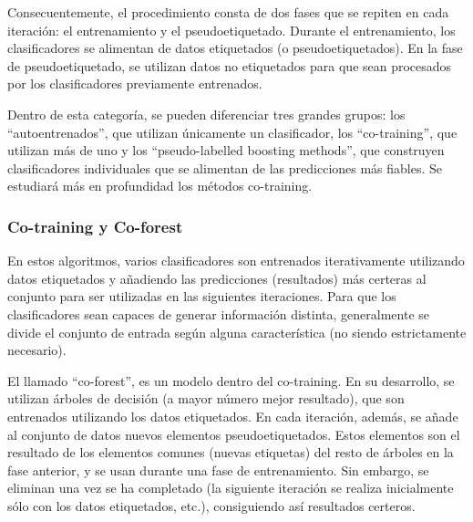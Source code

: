 Consecuentemente, el procedimiento consta de dos fases que se repiten en cada iteración: el entrenamiento y el pseudoetiquetado. Durante el entrenamiento, los clasificadores se alimentan de datos etiquetados (o pseudoetiquetados). En la fase de pseudoetiquetado, se utilizan datos no etiquetados para que sean procesados por los clasificadores previamente entrenados. 

Dentro de esta categoría, se pueden diferenciar tres grandes grupos: los “autoentrenados”, que utilizan únicamente un clasificador, los “co-training”, que utilizan más de uno y los “pseudo-labelled boosting methods”, que construyen clasificadores individuales que se alimentan de las predicciones más fiables. Se estudiará más en profundidad los métodos co-training.

\subsubsection{Co-training y Co-forest}

En estos algoritmos, varios clasificadores son entrenados iterativamente utilizando datos etiquetados y añadiendo las predicciones (resultados) más certeras al conjunto para ser utilizadas en las siguientes iteraciones. Para que los clasificadores sean capaces de generar información distinta, generalmente se divide el conjunto de entrada según alguna característica (no siendo estrictamente necesario).

El llamado “co-forest”, es un modelo dentro del co-training. En su desarrollo, se utilizan árboles de decisión (a mayor número mejor resultado), que son entrenados utilizando los datos etiquetados. En cada iteración, además, se añade al conjunto de datos nuevos elementos pseudoetiquetados. Estos elementos son el resultado de los elementos comunes (nuevas etiquetas) del resto de árboles en la fase anterior, y se usan durante una fase de entrenamiento. Sin embargo, se eliminan una vez se ha completado (la siguiente iteración se realiza inicialmente sólo con los datos etiquetados, etc.), consiguiendo así resultados certeros.









